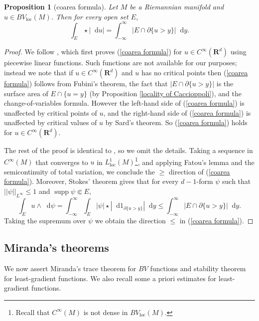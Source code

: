 \documentclass[reqno,12pt,letterpaper]{amsart}
\newcommand{\RR}{\mathbf{R}}
\DeclareMathOperator{\supp}{supp}
\newcommand*\dif{\mathop{}\!\mathrm{d}}
\newcommand{\loc}{\mathrm{loc}}
\newtheorem{proposition}[theorem]{Proposition}
\theoremstyle{definition}
\numberwithin{equation}{section}
\begin{document}
\begin{proposition}[coarea formula]\label{Coarea2}
Let $M$ be a Riemannian manifold and $u \in BV_\loc(M)$. Then for every open set $E$,
\begin{equation}\label{coarea formula}
\int_E \star |\dif u| = \int_{-\infty}^\infty |E \cap \partial \{u > y\}| \dif y.
\end{equation}
\end{proposition}
\begin{proof}
We follow \cite[Theorem 1.23]{Giusti77}, which first proves (\ref{coarea formula}) for $u \in C^\infty(\RR^d)$ using piecewise linear functions.
Such functions are not available for our purposes; instead we note that if $u \in C^\infty(\RR^d)$ and $u$ has no critical points then (\ref{coarea formula}) follows from Fubini's theorem, the fact that $|E \cap \partial \{u > y\}|$ is the surface area of $E \cap \{u = y\}$ (by Proposition \ref{locality of Caccioppoli}), and the change-of-variables formula.
However the left-hand side of (\ref{coarea formula}) is unaffected by critical points of $u$, and the right-hand side of (\ref{coarea formula}) is unaffected by critical values of $u$ by Sard's theorem.
So (\ref{coarea formula}) holds for $u \in C^\infty(\RR^d)$.

The rest of the proof is identical to \cite[Theorem 1.23]{Giusti77}, so we omit the details.
Taking a sequence in $C^\infty(M)$ that converges to $u$ in $L^1_\loc(M)$\footnote{Recall that $C^\infty(M)$ is not dense in $BV_\loc(M)$.}, and applying Fatou's lemma and the semicontinuity of total variation, we conclude the $\geq$ direction of (\ref{coarea formula}).
Moreover, Stokes' theorem gives that for every $d-1$-form $\psi$ such that $||\psi||_{L^\infty} \leq 1$ and $\supp \psi \Subset E$,
$$\int_E u \wedge \dif \psi = \int_{-\infty}^\infty \int_E |\psi| \star |\dif 1_{\partial \{u > y\}}| \dif y \leq \int_{-\infty}^\infty |E \cap \partial \{u > y\}| \dif y.$$
Taking the supremum over $\psi$ we obtain the direction $\leq$ in (\ref{coarea formula}).
\end{proof}


\subsection{Miranda's theorems}
We now assert Miranda's trace theorem for $BV$ functions and stability theorem for least-gradient functions.
We also recall some a priori estimates for least-gradient functions.
\end{document}
